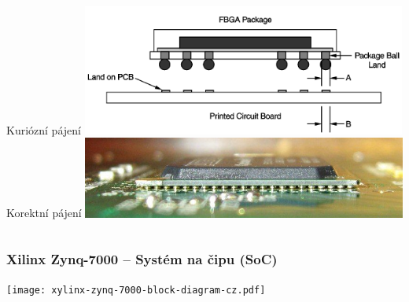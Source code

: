 \documentclass{beamer}
\begin{document}
\begin{frame}
\begin{columns}
\begin{column}{0.5\textwidth}
\begin{center}
    Kuriózní pájení
    \newline
    \includegraphics[width=0.8\textwidth]{fig/bga-dimensions-diagram.png}
    \newline
    Korektní pájení
    \newline
    \includegraphics[width=0.8\textwidth]{fig/bga-soldering-proper.jpg}
  \end{center}
\end{column}
\end{columns}

\end{frame}

\begin{frame}
\frametitle{Xilinx Zynq-7000 -- Systém na čipu (SoC)}
  \begin{center}
    \texttt{[image: xylinx-zynq-7000-block-diagram-cz.pdf]}
  \end{center}
\end{frame}
\end{document}
